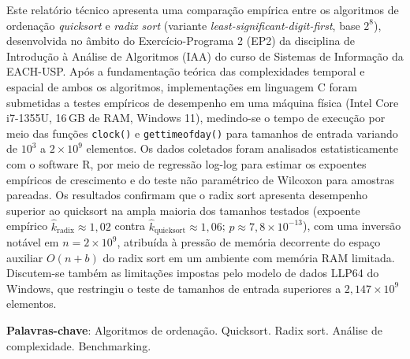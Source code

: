 \documentclass[
	12pt,
	oneside,
	a4paper,
	chapter=TITLE,
	section=TITLE,
	subsection=TITLE,
	subsubsection=TITLE,
	english,
	brazil
]{abntex2}
\theoremstyle{plain}
\theoremstyle{remark}
\renewcommand{\_}{\underscoreoriginal\allowbreak}
\begin{document}
\frenchspacing

\pretextual

\imprimircapa
\imprimirfolhaderosto

\setlength{\absparsep}{18pt}
\begin{resumo}
Este relatório técnico apresenta uma comparação empírica entre os algoritmos de ordenação \emph{quicksort} e \emph{radix sort} (variante \textit{least-significant-digit-first}, base $2^{8}$), desenvolvida no âmbito do Exercício-Programa 2 (EP2) da disciplina de Introdução à Análise de Algoritmos (IAA) do curso de Sistemas de Informação da EACH-USP. Após a fundamentação teórica das complexidades temporal e espacial de ambos os algoritmos, implementações em linguagem C foram submetidas a testes empíricos de desempenho em uma máquina física (Intel Core i7-1355U, 16\,GB de RAM, Windows 11), medindo-se o tempo de execução por meio das funções \texttt{clock()} e \texttt{gettimeofday()} para tamanhos de entrada variando de $10^{3}$ a $2\times10^{9}$ elementos. Os dados coletados foram analisados estatisticamente com o software R, por meio de regressão log-log para estimar os expoentes empíricos de crescimento e do teste não paramétrico de Wilcoxon para amostras pareadas. Os resultados confirmam que o radix sort apresenta desempenho superior ao quicksort na ampla maioria dos tamanhos testados (expoente empírico $\hat{k}_{\text{radix}} \approx 1{,}02$ contra $\hat{k}_{\text{quicksort}} \approx 1{,}06$; $p \approx 7{,}8\times10^{-13}$), com uma inversão notável em $n = 2\times10^{9}$, atribuída à pressão de memória decorrente do espaço auxiliar $O(n+b)$ do radix sort em um ambiente com memória RAM limitada. Discutem-se também as limitações impostas pelo modelo de dados LLP64 do Windows, que restringiu o teste de tamanhos de entrada superiores a $2{,}147\times10^{9}$ elementos.

\vspace{\onelineskip}
\noindent
\textbf{Palavras-chave}: Algoritmos de ordenação. Quicksort. Radix sort. Análise de complexidade. Benchmarking.
\end{resumo}
\end{document}

